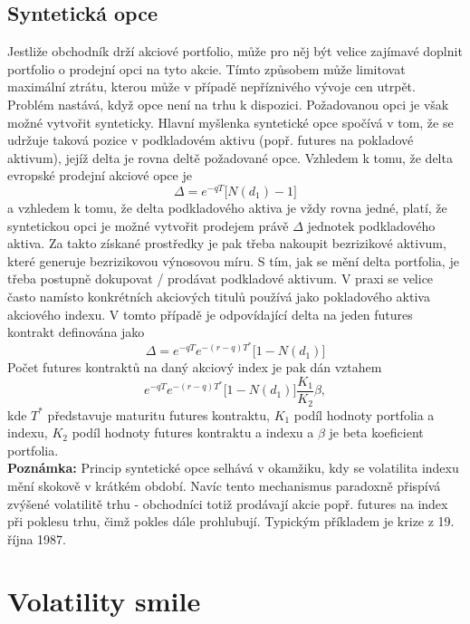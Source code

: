 \documentclass[a4paper]{book}
\begin{document}
\section{Syntetická opce}

Jestliže obchodník drží akciové portfolio, může pro něj být velice zajímavé doplnit portfolio o prodejní opci na tyto akcie. Tímto způsobem může limitovat maximální ztrátu, kterou může v případě nepříznivého vývoje cen utrpět. Problém nastává, když opce není na trhu k dispozici. Požadovanou opci je však možné vytvořit synteticky. Hlavní myšlenka syntetické opce spočívá v tom, že se udržuje taková pozice v podkladovém aktivu (popř. futures na pokladové aktivum), jejíž delta je rovna deltě požadované opce. Vzhledem k tomu, že delta evropské prodejní akciové opce je
\begin{equation*}
\Delta = e^{-qT} \bigg[ N(d_1)-1 \bigg]
\end{equation*}
a vzhledem k tomu, že delta podkladového aktiva je vždy rovna jedné, platí, že syntetickou opci je možné vytvořit prodejem právě $\Delta$ jednotek podkladového aktiva. Za takto získané prostředky je pak třeba nakoupit bezrizikové aktivum, které generuje bezrizikovou výnosovou míru. S tím, jak se mění delta portfolia, je třeba postupně dokupovat / prodávat podkladové aktivum.
V praxi se velice často namísto konkrétních akciových titulů používá jako pokladového aktiva akciového indexu. V tomto případě je odpovídající delta na jeden futures kontrakt definována jako
\begin{equation*}
\Delta = e^{-qT}e^{-(r-q)T^*} \bigg[1-N(d_1)\bigg]
\end{equation*}
Počet futures kontraktů na daný akciový index je pak dán vztahem
\begin{equation*}
e^{-qT}e^{-(r-q)T^*} \bigg[1-N(d_1)\bigg] \frac{K_1}{K_2} \beta,
\end{equation*}
kde $T^*$ představuje maturitu futures kontraktu, $K_1$ podíl hodnoty portfolia a indexu, $K_2$ podíl hodnoty futures kontraktu a indexu a $\beta$ je beta koeficient portfolia.\\

\noindent \textbf{Poznámka:} Princip syntetické opce selhává v okamžiku, kdy se volatilita indexu mění skokově v krátkém období. Navíc tento mechanismus paradoxně přispívá zvýšené volatilitě trhu - obchodníci totiž prodávají akcie popř. futures na index při poklesu trhu, čimž pokles dále prohlubují. Typickým příkladem je krize z 19. října 1987.

\chapter{Volatility smile}
\end{document}
